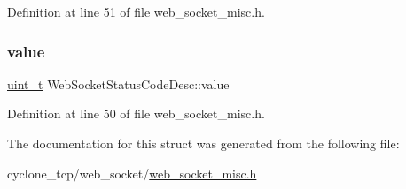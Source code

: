 Definition at line 51 of file web\+\_\+socket\+\_\+misc.\+h.

\mbox{\label{structWebSocketStatusCodeDesc_a36b5c876c9394b0d5034e9bac778c391}} 
\subsubsection{\texorpdfstring{value}{value}}
{\footnotesize\ttfamily \hyperlink{compiler__port_8h_a12a1e9b3ce141648783a82445d02b58d}{uint\+\_\+t} Web\+Socket\+Status\+Code\+Desc\+::value}



Definition at line 50 of file web\+\_\+socket\+\_\+misc.\+h.



The documentation for this struct was generated from the following file\+:\begin{DoxyCompactItemize}
\item 
cyclone\+\_\+tcp/web\+\_\+socket/\hyperlink{web__socket__misc_8h}{web\+\_\+socket\+\_\+misc.\+h}\end{DoxyCompactItemize}
